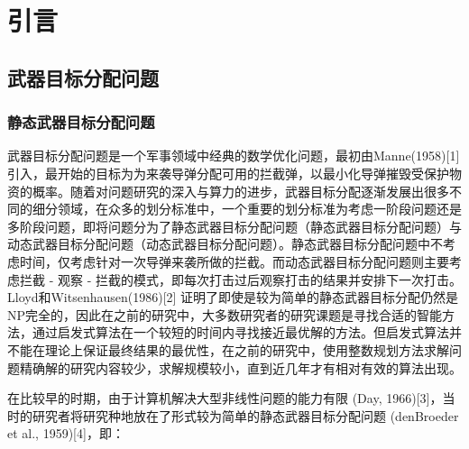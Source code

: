 \chapter{引言}\label{chap:introduction}


\section{武器目标分配问题}
\subsection{静态武器目标分配问题}
武器目标分配问题是一个军事领域中经典的数学优化问题，最初由Manne(1958)[1] 引入，最开始的目标为为来袭导弹分配可用的拦截弹，以最小化导弹摧毁受保护物资的概率。随着对问题研究的深入与算力的进步，武器目标分配逐渐发展出很多不同的细分领域，在众多的划分标准中，一个重要的划分标准为考虑一阶段问题还是多阶段问题，即将问题分为了静态武器目标分配问题（静态武器目标分配问题）与动态武器目标分配问题（动态武器目标分配问题）。静态武器目标分配问题中不考虑时间，仅考虑针对一次导弹来袭所做的拦截。而动态武器目标分配问题则主要考虑拦截 - 观察 - 拦截的模式，即每次打击过后观察打击的结果并安排下一次打击。Lloyd和Witsenhausen(1986)[2] 证明了即使是较为简单的静态武器目标分配仍然是NP完全的，因此在之前的研究中，大多数研究者的研究课题是寻找合适的智能方法，通过启发式算法在一个较短的时间内寻找接近最优解的方法。但启发式算法并不能在理论上保证最终结果的最优性，在之前的研究中，使用整数规划方法求解问题精确解的研究内容较少，求解规模较小，直到近几年才有相对有效的算法出现。

在比较早的时期，由于计算机解决大型非线性问题的能力有限 (Day, 1966)[3]，当时的研究者将研究种地放在了形式较为简单的静态武器目标分配问题 (denBroeder et al., 1959)[4]，即：

